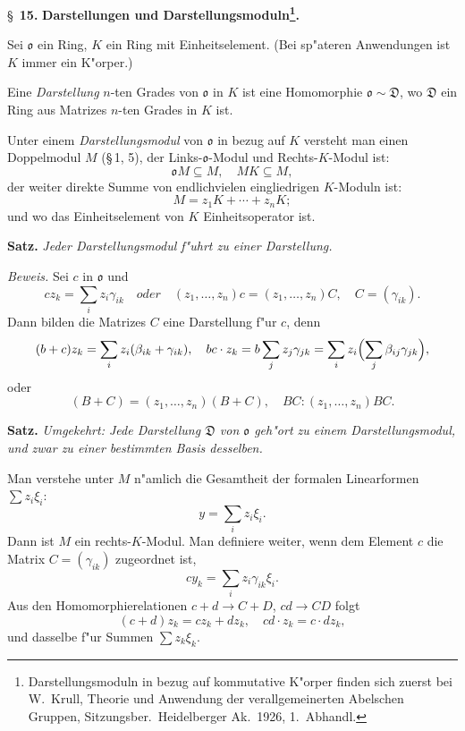 \documentclass[12pt,a4paper]{article}
\theoremstyle{plain}
\begin{document}
\S~\textbf{15.}
\textbf{Darstellungen und Darstellungsmoduln\footnote{Darstellungsmoduln in bezug auf kommutative K"orper finden sich zuerst bei W.\ Krull, Theorie und Anwendung der verallgemeinerten Abelschen Gruppen, Sitzungsber.\ Heidelberger Ak.\ 1926, 1.\ Abhandl.}.}

\smallskip

\noindent
Sei $\mathfrak{o}$ ein Ring, $K$ ein Ring mit Einheitselement. (Bei sp"ateren Anwendungen ist $K$ immer ein K"orper.)

Eine \textit{Darstellung} $n$-ten Grades von $\mathfrak{o}$ in $K$ ist eine Homomorphie $\mathfrak{o} \sim \mathfrak{D}$, wo $\mathfrak{D}$ ein Ring aus Matrizes $n$-ten Grades in $K$ ist.

Unter einem \textit{Darstellungsmodul} von $\mathfrak{o}$ in bezug auf $K$ versteht man einen Doppelmodul $M$ (\S\,1, 5), der Links-$\mathfrak{o}$-Modul und Rechts-$K$-Modul ist:
\[
\mathfrak{o}M \subseteq M,\quad MK \subseteq M,
\]
der weiter direkte Summe von endlichvielen eingliedrigen $K$-Moduln ist:
\[
M = z_1K + \cdots + z_nK;
\]
und wo das Einheitselement von $K$ Einheitsoperator ist.

\medskip\noindent\textbf{Satz.}
\textit{Jeder Darstellungsmodul f"uhrt zu einer Darstellung.}

\noindent\textit{Beweis.}
Sei $c$ in $\mathfrak{o}$ und
\[
cz_k = \sum_i z_i\gamma_{ik}\quad{oder}\quad(z_1,\ldots,z_n)c = (z_1,\ldots,z_n)C,\quad C = (\gamma_{ik}).
\]
Dann bilden die Matrizes $C$ eine Darstellung f"ur $c$, denn
\[
(b+c)z_k = \sum_i z_i(\beta_{ik} + \gamma_{ik}),\quad
bc \cdot z_k = b\sum_j z_j\gamma_{jk} = \sum_i z_i\Bigl(\sum_j \beta_{ij}\gamma_{jk}\Bigr),
\]
oder
\[
(B+C) = (z_1,\ldots,z_n)(B+C),\quad BC: (z_1,\ldots,z_n)BC.
\]

\medskip\noindent\textbf{Satz.}
\textit{Umgekehrt: Jede Darstellung $\mathfrak{D}$ von $\mathfrak{o}$ geh"ort zu einem Darstellungsmodul, und zwar zu einer bestimmten Basis desselben.}

Man verstehe unter $M$ n"amlich die Gesamtheit der formalen Linearformen $\sum z_i\xi_i$:
\[
y = \sum_i z_i\xi_i.
\]
Dann ist $M$ ein rechts-$K$-Modul. Man definiere weiter, wenn dem Element $c$ die Matrix $C = (\gamma_{ik})$ zugeordnet ist,
\[
cy_k = \sum_i z_i\gamma_{ik}\xi_i.\tag{1}
\]
Aus den Homomorphierelationen $c+d \to C+D$, $cd \to CD$ folgt
\[
(c+d)z_k = cz_k + dz_k,\quad cd \cdot z_k = c \cdot dz_k,
\]
und dasselbe f"ur Summen $\sum z_k\xi_k$.
\end{document}
